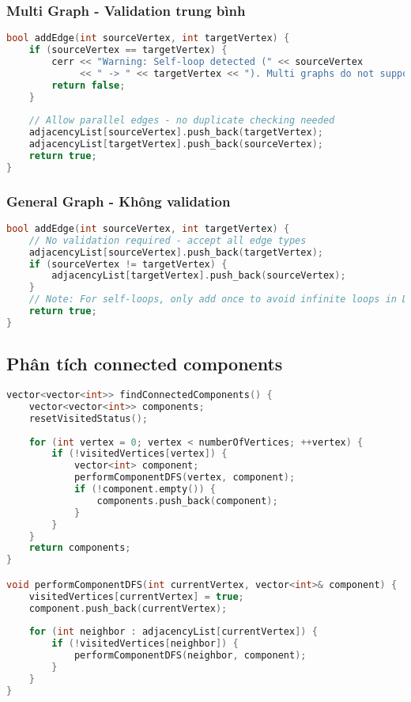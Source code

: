 \documentclass[12pt]{article}
\begin{document}
\subsubsection*{Multi Graph - Validation trung bình}
\begin{lstlisting}[language=C++, basicstyle=\ttfamily\footnotesize, frame=single]
bool addEdge(int sourceVertex, int targetVertex) {
    if (sourceVertex == targetVertex) {
        cerr << "Warning: Self-loop detected (" << sourceVertex 
             << " -> " << targetVertex << "). Multi graphs do not support self-loops.\n";
        return false;
    }
    
    // Allow parallel edges - no duplicate checking needed
    adjacencyList[sourceVertex].push_back(targetVertex);
    adjacencyList[targetVertex].push_back(sourceVertex);
    return true;
}
\end{lstlisting}

\subsubsection*{General Graph - Không validation}
\begin{lstlisting}[language=C++, basicstyle=\ttfamily\footnotesize, frame=single]
bool addEdge(int sourceVertex, int targetVertex) {
    // No validation required - accept all edge types
    adjacencyList[sourceVertex].push_back(targetVertex);
    if (sourceVertex != targetVertex) {
        adjacencyList[targetVertex].push_back(sourceVertex);
    }
    // Note: For self-loops, only add once to avoid infinite loops in DFS
    return true;
}
\end{lstlisting}

\subsection*{Phân tích connected components}

\begin{lstlisting}[language=C++, basicstyle=\ttfamily\footnotesize, frame=single]
vector<vector<int>> findConnectedComponents() {
    vector<vector<int>> components;
    resetVisitedStatus();
    
    for (int vertex = 0; vertex < numberOfVertices; ++vertex) {
        if (!visitedVertices[vertex]) {
            vector<int> component;
            performComponentDFS(vertex, component);
            if (!component.empty()) {
                components.push_back(component);
            }
        }
    }
    return components;
}

void performComponentDFS(int currentVertex, vector<int>& component) {
    visitedVertices[currentVertex] = true;
    component.push_back(currentVertex);
    
    for (int neighbor : adjacencyList[currentVertex]) {
        if (!visitedVertices[neighbor]) {
            performComponentDFS(neighbor, component);
        }
    }
}
\end{lstlisting}
\end{document}
